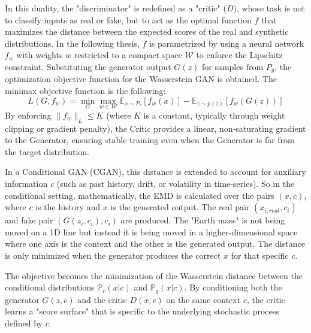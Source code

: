 In this duality, the "discriminator" is redefined as a "critic" ($D$), whose task is not to classify
inputs as real or fake, but to act as the optimal function $f$ that maximizes the distance between the 
expected scores of the real and synthetic distributions.
In the following thesis, $f$ is parametrized by using a neural network $f_w$ with weights $w$ restricted to a compact space $\mathcal{W}$ to enforce the Lipschitz constraint.
Substituting the generator output $G(z)$ for samples from $P_g$, the optimization objective function for the Wasserstein GAN is obtained.
The minimax objective function is the following:
\begin{equation}
    \label{eq:wgan_objective_function}
    L(G, f_w) = \min_G \max_{w \in \mathcal{W}} \mathbb{E}_{x \sim P_r}[f_w(x)] - \mathbb{E}_{z \sim p(z)}[f_w(G(z))]
\end{equation}
By enforcing $\|f_w\|_L \leq K$ (where $K$ is a constant, typically through weight clipping or gradient penalty), the Critic provides a linear, non-saturating gradient to the Generator, ensuring stable training even when the Generator is far from the target distribution.

In a Conditional GAN (CGAN), this distance is 
extended to account for auxiliary information $c$ (such as past history, drift, or volatility in 
time-series). So in the conditional setting, 
mathematically, the EMD is calculated over the pairs $(x, c)$, where $c$ is the history and $x$ is the generated output.
The real pair $(x_{i, real}, c_i)$ and fake pair $(G(z_i, c_i), c_i)$ are produced. The "Earth mass" is not being moved on a 1D line but instead it is being moved in a higher-dimensional space where one axis is the context and the other is the generated output. 
The distance is only minimized when the generator produces the correct $x$ for that specific $c$.

The objective becomes the minimization of the Wasserstein distance between the 
conditional distributions $\mathbb{P}_r(x|c)$ and $\mathbb{P}_g(x|c)$. 
By conditioning both the generator $G(z, c)$ and the critic $D(x, c)$ on the same context $c$,
the critic learns a "score surface" that is specific to the underlying stochastic process defined by $c$.


